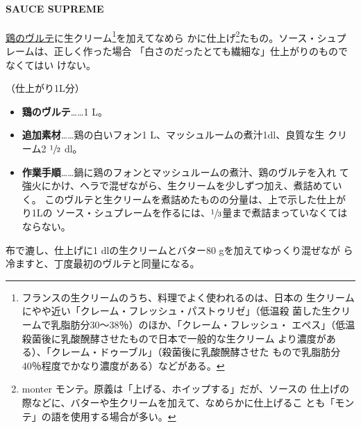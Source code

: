\hypertarget{sauce-supreme}{%
\paragraph{SAUCE SUPREME}\label{sauce-supreme}}


\protect\hyperlink{veloute-de-volaille}{鶏のヴルテ}に生クリーム\footnote{フランスの生クリームのうち、料理でよく使われるのは、日本の
  生クリームにやや近い「クレーム・フレッシュ・パストゥリゼ」（低温殺
  菌した生クリームで乳脂肪分30〜38％）のほか、「クレーム・フレッシュ・
  エペス」（低温殺菌後に乳酸醗酵させたもので日本で一般的な生クリーム
  より濃度がある）、「クレーム・ドゥーブル」（殺菌後に乳酸醗酵させた
  もので乳脂肪分40％程度でかなり濃度がある）などがある。}を加えてなめら
かに仕上げ\footnote{monter
  モンテ。原義は「上げる、ホイップする」だが、ソースの
  仕上げの際などに、バターや生クリームを加えて、なめらかに仕上げるこ
  とも「モンテ」の語を使用する場合が多い。}たもの。ソース・シュプレームは、正しく作った場合
「白さのだったとても繊細な」仕上がりのものでなくてはい
けない。

（仕上がり1L分）

\begin{itemize}
\item
  \textbf{鶏のヴルテ}\ldots{}\ldots{}1 L。
\item
  \textbf{追加素材}\ldots{}\ldots{}鶏の白いフォン1
  L、マッシュルームの煮汁1dl、良質な生 クリーム2 \(\sfrac{1}{2}\) dl。
\item
  \textbf{作業手順}\ldots{}\ldots{}鍋に鶏のフォンとマッシュルームの煮汁、鶏のヴルテを入れ
  て強火にかけ、ヘラで混ぜながら、生クリームを少しずつ加え、煮詰めていく。
  このヴルテと生クリームを煮詰めたものの分量は、上で示した仕上がり1Lの
  ソース・シュプレームを作るには、\(\sfrac{1}{3}\)量まで煮詰まっていなくてはならない。
\end{itemize}

布で漉し、仕上げに1 dlの生クリームとバター80 gを加えてゆっくり混ぜなが
ら冷ますと、丁度最初のヴルテと同量になる。

\maeaki

